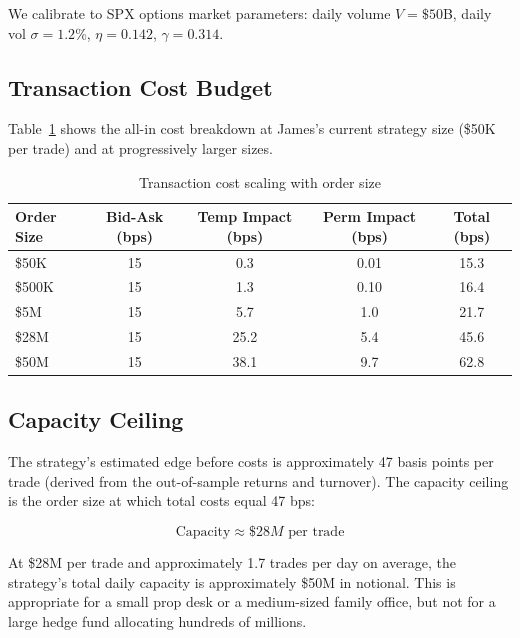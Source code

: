 \documentclass[12pt, letterpaper]{article}
\begin{document}
We calibrate to SPX options market parameters: daily volume $V = \$50$B,
daily vol $\sigma = 1.2\%$, $\eta = 0.142$, $\gamma = 0.314$.

\subsection{Transaction Cost Budget}

Table~\ref{tab:tcost} shows the all-in cost breakdown at James's current
strategy size (\$50K per trade) and at progressively larger sizes.

\begin{table}[h!]
\centering
\caption{Transaction cost scaling with order size}
\begin{tabular}{lcccc}
\toprule
\textbf{Order Size} & \textbf{Bid-Ask (bps)} & \textbf{Temp Impact (bps)} & \textbf{Perm Impact (bps)} & \textbf{Total (bps)} \\
\midrule
\$50K   &  15 & 0.3  & 0.01 & 15.3  \\
\$500K  &  15 & 1.3  & 0.10 & 16.4  \\
\$5M    &  15 & 5.7  & 1.0  & 21.7  \\
\$28M   &  15 & 25.2 & 5.4  & 45.6  \\
\$50M   &  15 & 38.1 & 9.7  & 62.8  \\
\bottomrule
\end{tabular}
\label{tab:tcost}
\end{table}

\subsection{Capacity Ceiling}

The strategy's estimated edge before costs is approximately 47 basis points
per trade (derived from the out-of-sample returns and turnover). The capacity
ceiling is the order size at which total costs equal 47 bps:

\begin{equation}
  \text{Capacity} \approx \$28M \text{ per trade}
  \label{eq:capacity}
\end{equation}

At \$28M per trade and approximately 1.7 trades per day on average,
the strategy's total daily capacity is approximately \$50M in notional.
This is appropriate for a small prop desk or a medium-sized family office,
but not for a large hedge fund allocating hundreds of millions.

\end{document}
